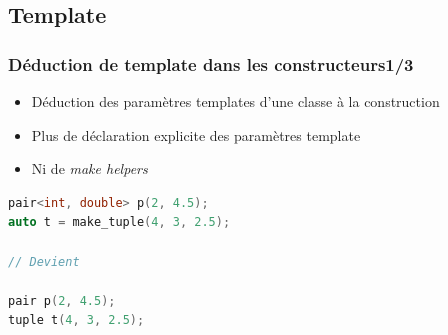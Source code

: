 \documentclass[C++.tex]{subfiles}
\begin{document}
\subsection*{Template}
\begin{frame}[fragile]
	\frametitle{Déduction de template dans les constructeurs\titlehfill{}1/3}
	\begin{itemize}
		\item Déduction des paramètres templates d'une classe à la construction
		\item Plus de déclaration explicite des paramètres template
		\item Ni de \textit{make helpers}
	\end{itemize}


	\begin{lstlisting}[language=C++]
pair<int, double> p(2, 4.5);
auto t = make_tuple(4, 3, 2.5);

// Devient

pair p(2, 4.5);
tuple t(4, 3, 2.5);\end{lstlisting}

\end{frame}
\end{document}
